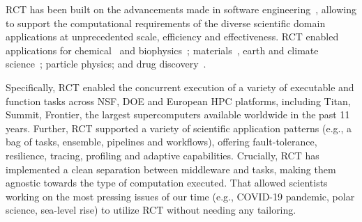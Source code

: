 \documentclass[preprint,12pt, a4paper]{elsarticle}
\begin{document}

RCT has been built on the advancements made in software
engineering~\cite{merzky2018synapse,merzky2021design,merzky2022raptor,turilli2018comprehensive,turilli2019middleware,luckow2012p},
allowing to support the computational requirements of the diverse scientific domain
applications at unprecedented scale, efficiency and effectiveness. RCT enabled
applications for chemical~\cite{sampat2018parallel} and
biophysics~\cite{shkurti2016coco,dakka2018high}; materials~\cite{dakka2018high},
earth and climate
science~\cite{paraskevakos2019workflow,balasubramanian2018harnessing}; particle
physics\cite{oleynik2017high}; and drug discovery~\cite{bfe-jctc-2014}.

Specifically, RCT enabled the concurrent execution of a variety of executable
and function tasks across NSF, DOE and European HPC platforms, including Titan,
Summit, Frontier, the largest supercomputers available worldwide in the past 11
years. Further, RCT supported a variety of scientific application patterns
(e.g., a bag of tasks, ensemble, pipelines and workflows), offering
fault-tolerance, resilience, tracing, profiling and adaptive capabilities.
Crucially, RCT has implemented a clean separation between middleware and tasks,
making them agnostic towards the type of computation executed. That allowed
scientists working on the most pressing issues of our time (e.g., COVID-19
pandemic, polar science, sea-level rise) to utilize RCT without needing any tailoring.



\end{document}
